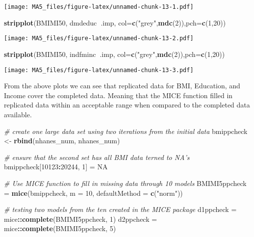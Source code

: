 \documentclass[]{article}
\newenvironment{Shaded}{\begin{snugshade}}{\end{snugshade}}
\newcommand{\KeywordTok}[1]{\textcolor[rgb]{0.13,0.29,0.53}{\textbf{#1}}}
\newcommand{\DataTypeTok}[1]{\textcolor[rgb]{0.13,0.29,0.53}{#1}}
\newcommand{\DecValTok}[1]{\textcolor[rgb]{0.00,0.00,0.81}{#1}}
\newcommand{\StringTok}[1]{\textcolor[rgb]{0.31,0.60,0.02}{#1}}
\newcommand{\CommentTok}[1]{\textcolor[rgb]{0.56,0.35,0.01}{\textit{#1}}}
\newcommand{\OtherTok}[1]{\textcolor[rgb]{0.56,0.35,0.01}{#1}}
\newcommand{\OperatorTok}[1]{\textcolor[rgb]{0.81,0.36,0.00}{\textbf{#1}}}
\newcommand{\NormalTok}[1]{#1}
\begin{document}
\texttt{[image: MA5\_files/figure-latex/unnamed-chunk-13-1.pdf]}

\begin{Shaded}
\begin{Highlighting}[]
\KeywordTok{stripplot}\NormalTok{(BMIMI50, dmdeduc}\OperatorTok{~}\NormalTok{.imp, }\DataTypeTok{col=}\KeywordTok{c}\NormalTok{(}\StringTok{"grey"}\NormalTok{,}\KeywordTok{mdc}\NormalTok{(}\DecValTok{2}\NormalTok{)),}\DataTypeTok{pch=}\KeywordTok{c}\NormalTok{(}\DecValTok{1}\NormalTok{,}\DecValTok{20}\NormalTok{))}
\end{Highlighting}
\end{Shaded}

\texttt{[image: MA5\_files/figure-latex/unnamed-chunk-13-2.pdf]}

\begin{Shaded}
\begin{Highlighting}[]
\KeywordTok{stripplot}\NormalTok{(BMIMI50, indfminc}\OperatorTok{~}\NormalTok{.imp, }\DataTypeTok{col=}\KeywordTok{c}\NormalTok{(}\StringTok{"grey"}\NormalTok{,}\KeywordTok{mdc}\NormalTok{(}\DecValTok{2}\NormalTok{)),}\DataTypeTok{pch=}\KeywordTok{c}\NormalTok{(}\DecValTok{1}\NormalTok{,}\DecValTok{20}\NormalTok{))}
\end{Highlighting}
\end{Shaded}

\texttt{[image: MA5\_files/figure-latex/unnamed-chunk-13-3.pdf]}

From the above plots we can see that replicated data for BMI, Education,
and Income cover the completed data. Meaning that the MICE function
filled in replicated data within an acceptable range when compared to
the completed data available.

\begin{Shaded}
\begin{Highlighting}[]
\CommentTok{# create one large data set using two iterations from the initial data}
\NormalTok{bmippcheck <-}\StringTok{ }\KeywordTok{rbind}\NormalTok{(nhanes_num, nhanes_num)}

\CommentTok{# ensure that the second set has all BMI data terned to NA's}
\NormalTok{bmippcheck[}\DecValTok{10123}\OperatorTok{:}\DecValTok{20244}\NormalTok{, }\DecValTok{1}\NormalTok{] =}\StringTok{ }\OtherTok{NA}

\CommentTok{# Use MICE function to fill in missing data through 10 models}
\NormalTok{BMIMI5ppcheck =}\StringTok{ }\KeywordTok{mice}\NormalTok{(bmippcheck, }\DataTypeTok{m =} \DecValTok{10}\NormalTok{, }\DataTypeTok{defaultMethod =} \KeywordTok{c}\NormalTok{(}\StringTok{"norm"}\NormalTok{))}

\CommentTok{# testing two models from the ten created in the MICE package}
\NormalTok{d1ppcheck =}\StringTok{ }\NormalTok{mice}\OperatorTok{::}\KeywordTok{complete}\NormalTok{(BMIMI5ppcheck, }\DecValTok{1}\NormalTok{)}
\NormalTok{d2ppcheck =}\StringTok{ }\NormalTok{mice}\OperatorTok{::}\KeywordTok{complete}\NormalTok{(BMIMI5ppcheck, }\DecValTok{5}\NormalTok{)}
\end{Highlighting}
\end{Shaded}
\end{document}
